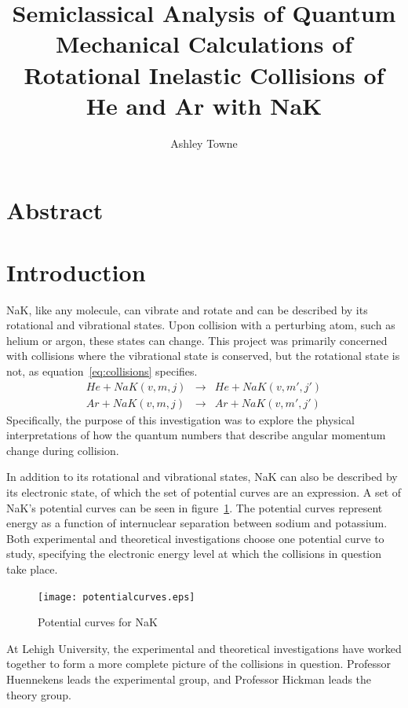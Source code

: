 \documentclass[letterpaper,titlepage,12pt]{article}
\author{Ashley Towne}
\title{Semiclassical Analysis of Quantum Mechanical Calculations of Rotational
Inelastic Collisions of He and Ar with NaK}
\begin{document}
\maketitle
\tableofcontents

\newpage
\section{Abstract}

\newpage
\section{Introduction}
NaK, like any molecule, can vibrate and rotate and can be described by its
rotational and vibrational states.  Upon collision with a perturbing atom,
such as helium or argon, these states can change.  This project was primarily
concerned with collisions where the vibrational state is conserved, but the
rotational state is not, as equation~\ref{eq:collisions} specifies.  
\begin{eqnarray}
    He+NaK(v,m,j)&\rightarrow& He+NaK(v,m',j') \nonumber\\
    Ar+NaK(v,m,j)&\rightarrow& Ar+NaK(v,m',j')
    \label{eq:collisions}
\end{eqnarray}
Specifically, the purpose of this investigation was
to explore the physical interpretations of how the quantum numbers that
describe angular momentum change during collision.

In addition to its rotational and vibrational states, NaK can also be described
by its electronic state, of which the set of potential curves are an
expression. A set of NaK's potential curves can be seen in
figure~\ref{fig:potentialcurves}. The potential curves represent energy as a function of internuclear
separation between sodium and potassium. Both experimental and theoretical
investigations choose one potential curve to study, specifying the electronic
energy level at which the collisions in question take place.

\begin{figure}[h]
    \centering
    \texttt{[image: potentialcurves.eps]}
    \caption{Potential curves for NaK}
\label{fig:potentialcurves}
\end{figure}
At Lehigh University, the experimental and theoretical investigations have
worked together to form a more complete picture of the collisions in question.
Professor Huennekens leads the experimental group, and Professor Hickman leads
the theory group.
\end{document}
